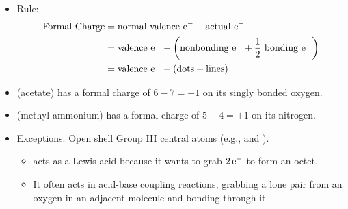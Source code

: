 \documentclass[../notes.tex]{subfiles}
\begin{document}
\begin{itemize}
\begin{itemize}
        \item Rule:
        \begin{align*}
            \text{Formal Charge} &= \text{normal valence }\e[-]-\text{actual }\e[-]\\
            &= \text{valence }\e[-]-\left( \text{nonbonding }\e[-]+\frac{1}{2}\text{ bonding }\e[-] \right)\\
            &= \text{valence }\e[-]-(\text{dots}+\text{lines})
        \end{align*}
        \item {} (acetate) has a formal charge of $6-7=-1$ on its singly bonded oxygen.
        \item {} (methyl ammonium) has a formal charge of $5-4=+1$ on its nitrogen.
        \item Exceptions: Open shell Group III central atoms (e.g.,  and ).
        \begin{itemize}
            \item {} acts as a Lewis acid because it wants to grab $2\,\e[-]$ to form an octet.
            \item It often acts in acid-base coupling reactions, grabbing a lone pair from an oxygen in an adjacent molecule and bonding through it.
        \end{itemize}
    \end{itemize}
\end{itemize}
\end{document}
